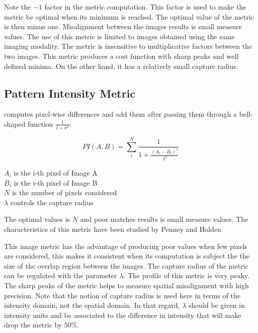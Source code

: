 Note the $-1$ factor in the metric computation. This factor is used to make the
metric be optimal when its minimum is reached.  The optimal value of the metric
is then minus one. Misalignment between the images results is small measure
values.  The use of this metric is limited to images obtained using the same
imaging modality.  The metric is insensitive to multiplicative factors between
the two images.  This metric produces a cost function with sharp peaks and well
defined minima.  On the other hand, it has a relatively small capture radius.

\subsection{Pattern Intensity Metric}
\label{sec:PatternIntensityMetric}
 computes pixel-wise differences and add them 
after passing them through a bell-shaped function $\frac{1}{1+x^2}$:

\begin{equation}
PI(A,B) =  \sum_i^N \frac{ 1 }{ 1 + \frac{ \left( A_i - B_i \right) ^ 2}{ \lambda^2 }  }
\end{equation}
\begin{center}
$A_i$ is the i-th pixel of Image A \\
$B_i$ is the i-th pixel of Image B \\
$N$ is the number of pixels considered \\
$\lambda$ controls the capture radius
\end{center}

The optimal values is $N$ and poor matches results is small measure values.
The characteristics of this metric have been studied by Penney and Holden
\cite{Holden1999}\cite{Penney1998}

This image metric has the advantage of producing poor values when few pixels
are considered, this makes it consistent when its computation is subject the
the size of the overlap region between the images. The capture radius of the
metric can be regulated with the parameter $\lambda$.  The profile of this
metric is very peaky. The sharp peaks of the metric helps to measure spatial
misalignment with high precision. Note that the notion of capture radius is
used here in terms of the intensity domain, not the spatial domain. In that
regard, $\lambda$ should be given in intensity units and be associated to the
difference in intensity that will make drop the metric by $50\%$.

